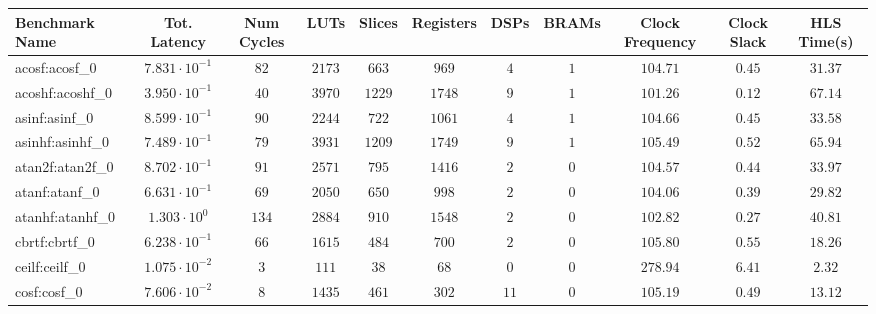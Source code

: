 \begin{tabular}{|l|c|c|c|c|c|c|c|c|c|c|}
\hline
Benchmark Name               & Tot. Latency            & Num Cycles & LUTs      & Slices    & Registers & DSPs    & BRAMs & Clock Frequency & Clock Slack & HLS Time(s) \\
\hline
acosf:acosf\_0               & $ 7.831 \cdot 10^{-1} $ & $ 82     $ & $ 2173  $ & $ 663   $ & $ 969   $ & $ 4   $ & $ 1 $ & $ 104.71      $ & $ 0.45    $ & $ 31.37   $ \\
acoshf:acoshf\_0             & $ 3.950 \cdot 10^{-1} $ & $ 40     $ & $ 3970  $ & $ 1229  $ & $ 1748  $ & $ 9   $ & $ 1 $ & $ 101.26      $ & $ 0.12    $ & $ 67.14   $ \\
asinf:asinf\_0               & $ 8.599 \cdot 10^{-1} $ & $ 90     $ & $ 2244  $ & $ 722   $ & $ 1061  $ & $ 4   $ & $ 1 $ & $ 104.66      $ & $ 0.45    $ & $ 33.58   $ \\
asinhf:asinhf\_0             & $ 7.489 \cdot 10^{-1} $ & $ 79     $ & $ 3931  $ & $ 1209  $ & $ 1749  $ & $ 9   $ & $ 1 $ & $ 105.49      $ & $ 0.52    $ & $ 65.94   $ \\
atan2f:atan2f\_0             & $ 8.702 \cdot 10^{-1} $ & $ 91     $ & $ 2571  $ & $ 795   $ & $ 1416  $ & $ 2   $ & $ 0 $ & $ 104.57      $ & $ 0.44    $ & $ 33.97   $ \\
atanf:atanf\_0               & $ 6.631 \cdot 10^{-1} $ & $ 69     $ & $ 2050  $ & $ 650   $ & $ 998   $ & $ 2   $ & $ 0 $ & $ 104.06      $ & $ 0.39    $ & $ 29.82   $ \\
atanhf:atanhf\_0             & $ 1.303 \cdot 10^{0}  $ & $ 134    $ & $ 2884  $ & $ 910   $ & $ 1548  $ & $ 2   $ & $ 0 $ & $ 102.82      $ & $ 0.27    $ & $ 40.81   $ \\
cbrtf:cbrtf\_0               & $ 6.238 \cdot 10^{-1} $ & $ 66     $ & $ 1615  $ & $ 484   $ & $ 700   $ & $ 2   $ & $ 0 $ & $ 105.80      $ & $ 0.55    $ & $ 18.26   $ \\
ceilf:ceilf\_0               & $ 1.075 \cdot 10^{-2} $ & $ 3      $ & $ 111   $ & $ 38    $ & $ 68    $ & $ 0   $ & $ 0 $ & $ 278.94      $ & $ 6.41    $ & $ 2.32    $ \\
cosf:cosf\_0                 & $ 7.606 \cdot 10^{-2} $ & $ 8      $ & $ 1435  $ & $ 461   $ & $ 302   $ & $ 11  $ & $ 0 $ & $ 105.19      $ & $ 0.49    $ & $ 13.12   $ \\

\end{tabular}
